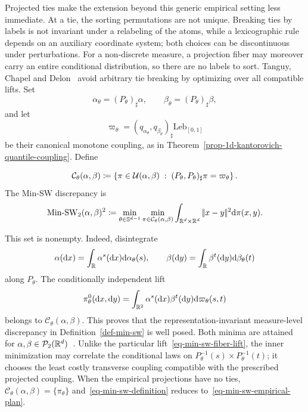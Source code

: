 Projected ties make the extension beyond this generic empirical setting less immediate. At a tie, the sorting permutations are not unique. Breaking ties by labels is not invariant under a relabeling of the atoms, while a lexicographic rule depends on an auxiliary coordinate system; both choices can be discontinuous under perturbations. For a non-discrete measure, a projection fiber may moreover carry an entire conditional distribution, so there are no labels to sort. Tanguy, Chapel and Delon~\cite{TanguyChapelDelon2025SlicedTransportPlans} avoid arbitrary tie breaking by optimizing over all compatible lifts. Set
\[
	\alpha_\theta=(P_\theta)_\sharp\alpha,
	\qquad
	\beta_\theta=(P_\theta)_\sharp\beta,
\]
and let
\[
	\varpi_\theta
	=
	(q_{\alpha_\theta},q_{\beta_\theta})_\sharp
	\mathrm{Leb}_{[0,1]}
\]
be their canonical monotone coupling, as in Theorem~\ref{prop-1d-kantorovich-quantile-coupling}. Define
\begin{defn}\label{def-min-sw}
\begin{equation}\label{eq-min-sw-constrained-lifts}
	\mathcal C_\theta(\alpha,\beta)
	\coloneqq
	\left\{
		\pi\in\mathcal{U}(\alpha,\beta)
		\;:\;
		(P_\theta,P_\theta)_\sharp\pi=\varpi_\theta
	\right\}.
\end{equation}
The Min-SW discrepancy is
\begin{equation}\label{eq-min-sw-definition}
	\operatorname{Min\text{-}SW}_2(\alpha,\beta)^2
	\coloneqq
	\min_{\theta\in\mathbb{S}^{d-1}}
	\min_{\pi\in\mathcal C_\theta(\alpha,\beta)}
	\int_{\mathbb{R}^d\times\mathbb{R}^d}|\!| x-y |\!|^2\mathrm{d}\pi(x,y).
\end{equation}
\end{defn}
This set is nonempty. Indeed, disintegrate
\[
	\alpha(\mathrm{d} x)=\int_{\mathbb{R}} \alpha^s(\mathrm{d} x)\mathrm{d}\alpha_\theta(s),
	\qquad
	\beta(\mathrm{d} y)=\int_{\mathbb{R}} \beta^t(\mathrm{d} y)\mathrm{d}\beta_\theta(t)
\]
along $P_\theta$. The conditionally independent lift
\begin{equation}\label{eq-min-sw-fiber-lift}
	\pi_\theta^0(\mathrm{d} x,\mathrm{d} y)
	=
	\int_{\mathbb{R}^2}
	\alpha^s(\mathrm{d} x)\beta^t(\mathrm{d} y)
	\mathrm{d}\varpi_\theta(s,t)
\end{equation}
belongs to $\mathcal C_\theta(\alpha,\beta)$. This proves that the representation-invariant measure-level discrepancy in Definition~\ref{def-min-sw} is well posed.
Both minima are attained for $\alpha,\beta\in\mathcal{P}_2(\mathbb{R}^d)$~\cite{TanguyChapelDelon2025SlicedTransportPlans}. Unlike the particular lift~\eqref{eq-min-sw-fiber-lift}, the inner minimization may correlate the conditional laws on
$P_\theta^{-1}(s)\times P_\theta^{-1}(t)$; it chooses the least costly transverse coupling compatible with the prescribed projected coupling. When the empirical projections have no ties, $\mathcal C_\theta(\alpha,\beta)=\{\pi_\theta\}$ and~\eqref{eq-min-sw-definition} reduces to~\eqref{eq-min-sw-empirical-plan}.

